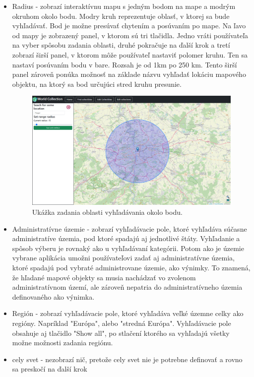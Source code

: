 \begin{itemize}
      \item Radius - zobrazí interaktívnu mapu s jedným bodom na mape a modrým okruhom okolo bodu. Modry kruh reprezentuje oblasť, v ktorej sa bude vyhľadávať.
            Bod je možne presúvať chytením a posúvaním po mape. Na ľavo od mapy je zobrazený panel, v ktorom sú tri tlačidla. Jedno vráti používateľa na vyber spôsobu zadania oblasti,
            druhé pokračuje na ďalší krok a tretí zobrazí širší panel, v ktorom môže používateľ nastaviť polomer kruhu. Ten sa nastaví posúvaním bodu v bare. Rozsah je od 1km po 250 km.
            Tento širší panel zároveň ponúka možnosť na základe názvu vyhľadať lokáciu mapového objektu, na ktorý sa bod určujúci stred kruhu presunie.
            \begin{figure}[h]
                  \includegraphics[width=140mm]{../img/ud-radius.png}
                  \centering
                  \caption{Ukážka zadania oblasti vyhľadávania okolo bodu.}
            \end{figure}
      \item Administratívne územie - zobrazí vyhľadávacie pole, ktoré vyhľadáva súčasne administratíve územia, pod ktoré spadajú aj jednotlivé štáty. Vyhľadanie a spôsob výberu je rovnaký ako u vyhľadávaní kategórii.
            Potom ako je územie vybrane aplikácia umožni používateľovi zadať aj administratívne územia, ktoré spadajú pod vybraté administrovane územie, ako výnimky. To znamená, že hľadané mapové objekty
            sa musia nachádzať vo zvolenom administratívnom území, ale zároveň nepatria do administratívneho územia definovaného ako výnimka.
      \item Región - zobrazí vyhľadávacie pole, ktoré vyhľadáva veľké územne celky ako regióny. Napríklad "Európa", alebo "stredná Európa". Vyhľadávacie pole obsahuje aj tlačidlo "Show all", po stlačení ktorého sa vyhľadajú všetky možne možnosti zadania regiónu.
      \item cely svet - nezobrazí nič, pretože cely svet nie je potrebne definovať a rovno sa preskočí na ďalší krok
\end{itemize}

